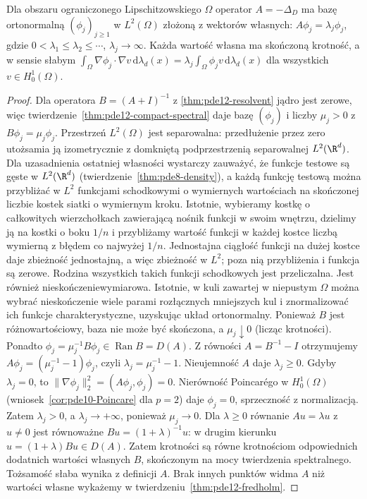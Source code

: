 \begin{wniosek}
\label{cor:pde12-eigen}
Dla obszaru ograniczonego Lipschitzowskiego $\Omega$ operator
$A=-\Delta_D$ ma bazę ortonormalną $(\phi_j)_{j\ge1}$ w
$L^2(\Omega)$ złożoną z wektorów własnych:
$A\phi_j=\lambda_j\phi_j$, gdzie
$0<\lambda_1\le\lambda_2\le\cdots$, $\lambda_j\to\infty$.
Każda wartość własna ma skończoną krotność,
a w sensie słabym
$\int_\Omega\nabla\phi_j\cdot\nabla v\,\mathrm d\lambda_d(x)
=\lambda_j\int_\Omega\phi_jv\,\mathrm d\lambda_d(x)$
dla wszystkich $v\in H_0^1(\Omega)$.
\end{wniosek}
\begin{proof}
Dla operatora $B=(A+I)^{-1}$ z
\ref{thm:pde12-resolvent} jądro jest zerowe,
więc twierdzenie~\ref{thm:pde12-compact-spectral}
daje bazę $(\phi_j)$ i liczby $\mu_j>0$ z
$B\phi_j=\mu_j\phi_j$.
Przestrzeń $L^2(\Omega)$ jest separowalna: przedłużenie
przez zero utożsamia ją izometrycznie z domkniętą
podprzestrzenią separowalnej $L^2(\R^d)$.
Dla uzasadnienia ostatniej własności wystarczy zauważyć,
że funkcje testowe są gęste w $L^2(\R^d)$
(twierdzenie~\ref{thm:pde8-density}), a każdą funkcję
testową można przybliżać w $L^2$ funkcjami schodkowymi
o wymiernych wartościach na skończonej liczbie kostek
siatki o wymiernym kroku. Istotnie, wybieramy kostkę
o całkowitych wierzchołkach zawierającą nośnik funkcji
w swoim wnętrzu, dzielimy ją na kostki o boku $1/n$
i przybliżamy wartość funkcji w każdej kostce liczbą
wymierną z błędem co najwyżej $1/n$. Jednostajna
ciągłość funkcji na dużej kostce daje zbieżność
jednostajną, a więc zbieżność w $L^2$; poza nią
przybliżenia i funkcja są zerowe. Rodzina wszystkich
takich funkcji schodkowych jest przeliczalna.
Jest również nieskończeniewymiarowa. Istotnie, w kuli
zawartej w niepustym $\Omega$ można wybrać nieskończenie
wiele parami rozłącznych mniejszych kul i znormalizować
ich funkcje charakterystyczne, uzyskując układ
ortonormalny.
Ponieważ $B$ jest różnowartościowy, baza nie może
być skończona, a $\mu_j\downarrow0$ (licząc krotności).
Ponadto $\phi_j=\mu_j^{-1}B\phi_j\in\operatorname{Ran}B=D(A)$.
Z równości $A=B^{-1}-I$ otrzymujemy
$A\phi_j=(\mu_j^{-1}-1)\phi_j$, czyli
$\lambda_j=\mu_j^{-1}-1$. Nieujemność $A$ daje
$\lambda_j\ge0$. Gdyby $\lambda_j=0$, to
$\|\nabla\phi_j\|_2^2=(A\phi_j,\phi_j)=0$.
Nierówność Poincarégo w $H_0^1(\Omega)$
(wniosek~\ref{cor:pde10-Poincare} dla $p=2$) daje
$\phi_j=0$, sprzeczność z normalizacją.
Zatem $\lambda_j>0$, a $\lambda_j\to+\infty$,
ponieważ $\mu_j\to0$. Dla $\lambda\ge0$ równanie
$Au=\lambda u$ z $u\ne0$ jest równoważne
$Bu=(1+\lambda)^{-1}u$: w drugim kierunku
$u=(1+\lambda)Bu\in D(A)$. Zatem krotności są równe
krotnościom odpowiednich dodatnich wartości własnych
$B$, skończonym na mocy twierdzenia spektralnego.
Tożsamość słaba wynika z definicji $A$.
Brak innych punktów widma $A$ niż wartości własne
wykażemy w twierdzeniu~\ref{thm:pde12-fredholm}.
\end{proof}

